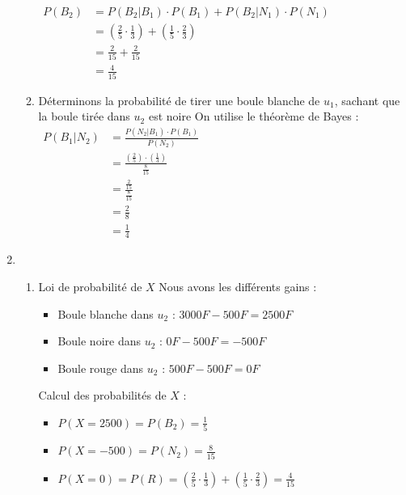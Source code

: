 \documentclass[12pt,a4paper]{article}
\begin{document}
\begin{enumerate}
\begin{enumerate}
    \(
    \begin{aligned}
        P(B_2) &= P(B_2 | B_1) \cdot P(B_1) + P(B_2 | N_1) \cdot P(N_1)\\
               &= \left( \frac{2}{5} \cdot \frac{1}{3} \right) + \left( \frac{1}{5} \cdot \frac{2}{3} \right)\\
               &= \frac{2}{15} + \frac{2}{15}  \\
               &= \frac{4}{15}
    \end{aligned}
    \)
    \item Déterminons la probabilité de tirer une boule blanche de $u_{1}$, sachant que la boule tirée dans $u_{2}$ est noire
On utilise le théorème de Bayes :\\
 \(
    \begin{aligned}
        P(B_1 | N_2) &= \frac{P(N_2 | B_1) \cdot P(B_1)}{P(N_2)}\\
                    &=  \frac{\left( \frac{2}{5} \right) \cdot \left( \frac{1}{3} \right)}{\frac{8}{15}}\\
                    &= \frac{\frac{2}{15}}{\frac{8}{15}}  \\
                    &= \frac{2}{8}\\
                    &= \frac{1}{4}
    \end{aligned}
    \)
\end{enumerate}
\item 
\begin{enumerate}
    \item Loi de probabilité de $X$ Nous avons les différents gains :
\begin{itemize}
    \item Boule blanche dans $u_{2}$ : $3000F - 500F = 2500F$
    \item Boule noire dans $u_{2}$ : $0F - 500F = -500F$
    \item Boule rouge dans $u_{2}$ : $500F - 500F = 0F$
\end{itemize}

Calcul des probabilités de $X$ :
\begin{itemize}
    \item $P(X = 2500) = P(B_{2}) = \frac{1}{5}$
    \item $P(X = -500) = P(N_{2}) = \frac{8}{15}$
    \item $P(X = 0) = P(R) = \left( \frac{2}{5} \cdot \frac{1}{3} \right) + \left( \frac{1}{5} \cdot \frac{2}{3} \right) = \frac{4}{15}$
\end{itemize}    


\end{enumerate}
\end{enumerate}
\end{document}
